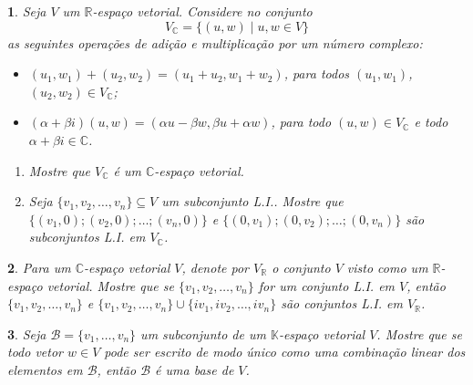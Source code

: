 \documentclass[12pt]{exam}
\newtheorem{exercicio}{}
\newcommand{\sub}{\subseteq}
\newcommand{\real}{\mathbb{R}}
\newcommand{\cp}[1]{\mathbb{#1}}
\begin{document}
\begin{exercicio}
  Seja $V$ um $\real$-espa\c{c}o vetorial. Considere no conjunto
  \[
    V_\cp{C} = \{(u,w) \mid u, w \in V\}
  \]
  as seguintes opera\c{c}\~oes de adi\c{c}\~ao e multiplica\c{c}\~ao por um n\'umero complexo:
  \begin{itemize}
    \item $(u_1, w_1) + (u_2, w_2) = (u_1 + u_2, w_1 + w_2)$, para todos $(u_1, w_1)$, $(u_2, w_2) \in V_\cp{C}$;
    \item $(\alpha + \beta i)(u, w) = (\alpha u - \beta w, \beta u + \alpha w)$, para todo $(u, w) \in V_\cp{C}$ e todo $\alpha + \beta i \in \cp{C}$.
  \end{itemize}
  \begin{enumerate}[label={\alph*})]
    \item Mostre que $V_\cp{C}$ \'e um $\cp{C}$-espa\c{c}o vetorial.
    \item Seja $\{v_1, v_2, \dots, v_n\} \sub V$ um subconjunto L.I.. Mostre que $\{(v_1,0); (v_2,0); \dots; (v_n, 0)\}$ e $\{(0, v_1); (0, v_2); \dots; (0, v_n)\}$ s\~ao subconjuntos L.I. em $V_\cp{C}$.
  \end{enumerate}
\end{exercicio}

\begin{exercicio}
  Para um $\cp{C}$-espa\c{c}o vetorial $V$, denote por $V_\real$ o conjunto $V$ visto como um $\real$-espa\c{c}o  vetorial. Mostre que se $\{v_1, v_2, \dots, v_n\}$ for um conjunto L.I. em $V$, ent\~ao $\{v_1, v_2, \dots, v_n\}$ e $\{v_1, v_2, \dots, v_n\} \cup \{iv_1, iv_2, \dots, iv_n\}$ s\~ao conjuntos L.I. em $V_\real$.
\end{exercicio}

\begin{exercicio}
  Seja $\mathcal{B} = \{v_1, \ldots, v_n\}$ um subconjunto de um $\cp{K}$-espa\c{c}o vetorial $V$. Mostre que se todo vetor $w \in V$ pode ser escrito de modo \'unico como uma combina\c{c}\~ao linear dos elementos em $\mathcal{B}$, ent\~ao $\mathcal{B}$ \'e uma base de $V$.
\end{exercicio}











% 
\end{document}
